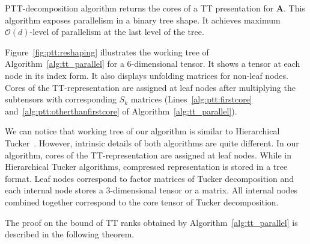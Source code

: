 \documentclass[runningheads]{llncs}
\newcommand{\tensor}[1]{{\cal\textbf{#1}\xspace}}
\begin{document}
PTT-decomposition algorithm returns the cores of a TT presentation for \tensor{A}. This algorithm exposes parallelism in a binary tree shape. It achieves maximum $\mathcal{O}(d)$-level of parallelism at the last level of the tree.

Figure~\ref{fig:ptt:reshaping} illustrates the working tree of Algorithm~\ref{alg:tt_parallel} for a $6$-dimensional tensor. It shows a tensor at each node in its index form. It also displays unfolding matrices for non-leaf nodes. Cores of the TT-representation are assigned at leaf nodes after multiplying the subtensors with corresponding $S_k$ matrices (Lines~\ref{alg:ptt:firstcore} and~\ref{alg:ptt:otherthanfirstcore} of Algorithm~\ref{alg:tt_parallel}). 

We can notice that working tree of our algorithm is similar to Hierarchical Tucker~\cite{h-tucker-Grasedyck}. However, intrinsic details of both algorithms are quite different. In our algorithm, cores of the TT-representation are assigned at leaf nodes. While in Hierarchical Tucker algorithms, compressed representation is stored in a tree format. Leaf nodes correspond to factor matrices of Tucker decomposition and each internal node stores a $3$-dimensional tensor or a matrix. All internal nodes combined together correspond to the core tensor of Tucker decomposition.

The proof on the bound of TT ranks obtained by Algorithm~\ref{alg:tt_parallel} is described in the following theorem.
\end{document}

